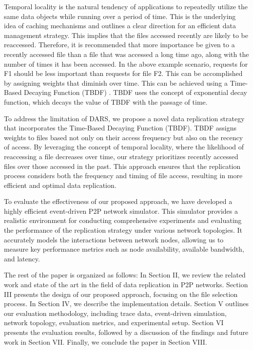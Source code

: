 \documentclass[10pt, conference]{IEEEtran}
\begin{document}
Temporal locality is the natural tendency of applications to repeatedly utilize the same data objects while running over a period of time. This is the underlying idea of caching mechanisms and outlines a clear direction for an efficient data management strategy. This implies that the files accessed recently are likely to be reaccessed. Therefore, it is recommended that more importance be given to a recently accessed file than a file that was accessed a long time ago, along with the number of times it has been accessed. In the above example scenario, requests for F1 should be less important than requests for file F2. This can be accomplished by assigning weights that diminish over time. This can be achieved using a Time-Based Decaying Function (TBDF) \cite{gill_2016_a}. TBDF uses the concept of exponential decay function, which decays the value of TBDF with the passage of time.

To address the limitation of DARS, we propose a novel data replication strategy that incorporates the Time-Based Decaying Function (TBDF). TBDF assigns weights to files based not only on their access frequency but also on the recency of access. By leveraging the concept of temporal locality, where the likelihood of reaccessing a file decreases over time, our strategy prioritizes recently accessed files over those accessed in the past. This approach ensures that the replication process considers both the frequency and timing of file access, resulting in more efficient and optimal data replication.

To evaluate the effectiveness of our proposed approach, we have developed a highly efficient event-driven P2P network simulator. This simulator provides a realistic environment for conducting comprehensive experiments and evaluating the performance of the replication strategy under various network topologies. It accurately models the interactions between network nodes, allowing us to measure key performance metrics such as node availability, available bandwidth, and latency.

The rest of the paper is organized as follows: In Section II, we review the related work and state of the art in the field of data replication in P2P networks. Section III presents the design of our proposed approach, focusing on the file selection process. In Section IV, we describe the implementation details. Section V outlines our evaluation methodology, including trace data, event-driven simulation, network topology, evaluation metrics, and experimental setup. Section VI presents the evaluation results, followed by a discussion of the findings and future work in Section VII. Finally, we conclude the paper in Section VIII.
\end{document}
